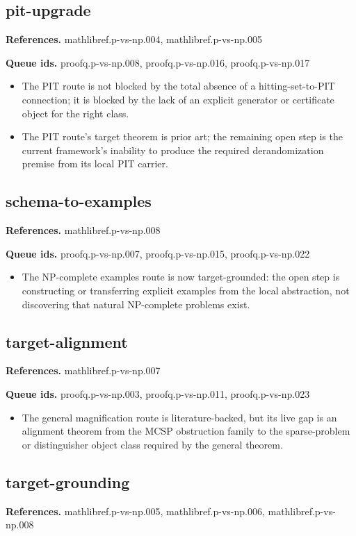\documentclass[11pt]{article}
\begin{document}
\subsection*{pit-upgrade}
\textbf{References.} mathlibref.p-vs-np.004, mathlibref.p-vs-np.005

\textbf{Queue ids.} proofq.p-vs-np.008, proofq.p-vs-np.016, proofq.p-vs-np.017

\begin{itemize}[leftmargin=*,itemsep=0.2em]
\item The PIT route is not blocked by the total absence of a hitting-set-to-PIT connection; it is blocked by the lack of an explicit generator or certificate object for the right class.
\item The PIT route's target theorem is prior art; the remaining open step is the current framework's inability to produce the required derandomization premise from its local PIT carrier.
\end{itemize}
\subsection*{schema-to-examples}
\textbf{References.} mathlibref.p-vs-np.008

\textbf{Queue ids.} proofq.p-vs-np.007, proofq.p-vs-np.015, proofq.p-vs-np.022

\begin{itemize}[leftmargin=*,itemsep=0.2em]
\item The NP-complete examples route is now target-grounded: the open step is constructing or transferring explicit examples from the local abstraction, not discovering that natural NP-complete problems exist.
\end{itemize}
\subsection*{target-alignment}
\textbf{References.} mathlibref.p-vs-np.007

\textbf{Queue ids.} proofq.p-vs-np.003, proofq.p-vs-np.011, proofq.p-vs-np.023

\begin{itemize}[leftmargin=*,itemsep=0.2em]
\item The general magnification route is literature-backed, but its live gap is an alignment theorem from the MCSP obstruction family to the sparse-problem or distinguisher object class required by the general theorem.
\end{itemize}
\subsection*{target-grounding}
\textbf{References.} mathlibref.p-vs-np.005, mathlibref.p-vs-np.006, mathlibref.p-vs-np.008
\end{document}
